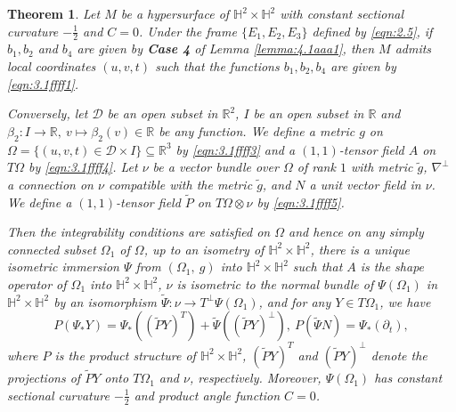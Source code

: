 \documentclass[reqno]{amsart}%
\newtheorem{theorem}{Theorem}[section]   %
\theoremstyle{definition}
\numberwithin{equation}{section}
\begin{document}
\begin{theorem}\label{thm:5.11a1}
Let $M$ be a hypersurface of $\mathbb{H}^2\times \mathbb{H}^2$ with constant sectional curvature $-\frac{1}{2}$ and $C=0$.
Under the frame $\{E_1,E_2,E_3\}$ defined by \eqref{eqn:2.5}, if $b_1,b_2$ and $b_4$ are
given by {\bf Case 4} of Lemma \ref{lemma:4.1aaa1}, then $M$ admits local coordinates $(u,v,t)$
such that the functions $b_1,b_2,b_4$ are given by \eqref{eqn:3.1ffff1}.


Conversely, let $\mathcal{D}$ be an open subset in $\mathbb{R}^2$, $I$ be an open subset in $\mathbb{R}$ and $\beta_2:I\to\mathbb{R},\ v\mapsto \beta_2(v)\in\mathbb{R}$ be any function. We define a metric $g$ on  $\Omega=\{(u,v,t)\in \mathcal{D}\times I\}\subseteq  \mathbb{R}^3$ by
\eqref{eqn:3.1ffff3}
and a $(1,1)$-tensor field $A$ on $T\Omega$ by
\eqref{eqn:3.1ffff4}.
Let $\nu$ be a vector bundle over  $\Omega$ of rank $1$ with metric $\tilde{g}$, $\nabla ^{\perp} $ a connection on $\nu$ compatible with the metric $\tilde{g}$, and $N$ a unit vector field in $\nu$.   We define a $(1,1)$-tensor field $\tilde{P}$ on $T\Omega\otimes \nu$ by
\eqref{eqn:3.1ffff5}.

Then the integrability conditions are satisfied on $\Omega$ and hence on any simply
connected subset $\Omega_1$ of $\Omega$, up to an isometry of  $\mathbb{H}^2\times \mathbb{H}^2$, there is a unique isometric immersion $\Psi$ from $(\Omega_1,~g)$ into $\mathbb{H}^2\times \mathbb{H}^2$ such that $A$ is the shape operator of  $\Omega_1$ into $\mathbb{H}^2\times \mathbb{H}^2$, $\nu$ is isometric to the normal bundle of $\Psi(\Omega_1)$ in
$\mathbb{H}^2\times \mathbb{H}^2$ by an isomorphism $\tilde{\Psi}:\nu\to T^{\perp}\Psi(\Omega_1)$,
and for any $Y\in T\Omega_1$, we have
\begin{equation}
	P(\Psi_{*}Y)=\Psi_{*}((\tilde{P}Y)^{T})+\tilde{\Psi}((\tilde{P}Y)^{\perp}),~
	P(\tilde{\Psi}N)=\Psi_*(\partial_t),
\end{equation}
where $P$ is the product structure of $\mathbb{H}^2\times \mathbb{H}^2$, $(\tilde{P}Y)^{T}$ and $(\tilde{P}Y)^{\perp}$ denote the projections of  $\tilde{P}Y$ onto $T\Omega_1$ and $\nu$, respectively.
Moreover, $\Psi(\Omega_1)$ has constant sectional curvature $-\frac{1}{2}$ and product angle function $C=0$.
\end{theorem}
%
\end{document}
